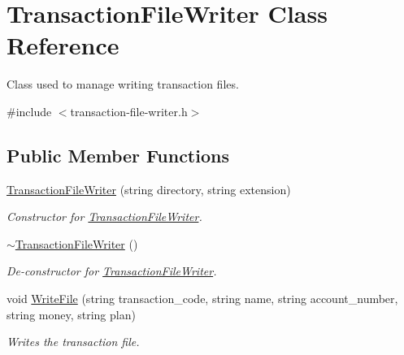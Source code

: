 \hypertarget{classTransactionFileWriter}{
\section{TransactionFileWriter Class Reference}
\label{classTransactionFileWriter}
}


Class used to manage writing transaction files.  




{\ttfamily \#include $<$transaction-\/file-\/writer.h$>$}

\subsection*{Public Member Functions}
\begin{DoxyCompactItemize}
\item 
\hyperlink{classTransactionFileWriter_a38805ea13f8ca006b21c48e7707032ed}{TransactionFileWriter} (string directory, string extension)
\begin{DoxyCompactList}\small\item\em Constructor for \hyperlink{classTransactionFileWriter}{TransactionFileWriter}. \item\end{DoxyCompactList}\item 
\hypertarget{classTransactionFileWriter_ac8ac2e3926d6587287b057647410e340}{
\hyperlink{classTransactionFileWriter_ac8ac2e3926d6587287b057647410e340}{$\sim$TransactionFileWriter} ()}
\label{classTransactionFileWriter_ac8ac2e3926d6587287b057647410e340}

\begin{DoxyCompactList}\small\item\em De-\/constructor for \hyperlink{classTransactionFileWriter}{TransactionFileWriter}. \item\end{DoxyCompactList}\item 
void \hyperlink{classTransactionFileWriter_ad5145cb11609d603ba71addc67c3247a}{WriteFile} (string transaction\_\-code, string name, string account\_\-number, string money, string plan)
\begin{DoxyCompactList}\small\item\em Writes the transaction file. \item\end{DoxyCompactList}\end{DoxyCompactItemize}



